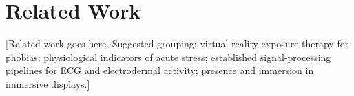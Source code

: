 \section{Related Work}
\label{sec:related}

[Related work goes here. Suggested grouping: virtual reality
exposure therapy for phobias; physiological indicators of acute
stress; established signal-processing pipelines for ECG and
electrodermal activity; presence and immersion in immersive
displays.]
